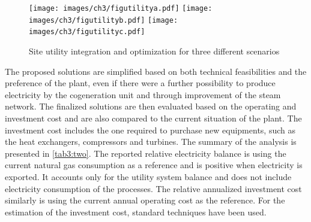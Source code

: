   \vspace{5mm}
 \begin{figure}[!ht]
 \begin{center}
 \texttt{[image: images/ch3/figutilitya.pdf]}
 \texttt{[image: images/ch3/figutilityb.pdf]}
 \texttt{[image: images/ch3/figutilityc.pdf]}
 \caption{Site utility integration and optimization for three different scenarios}
 \label{fig3:VIIII}
 \end{center}
  \vspace{-5mm}
 \end{figure}
 
 The proposed solutions are simplified based on both technical feasibilities and the preference of the plant, even if there were a further possibility to produce electricity by the cogeneration unit and through improvement of the steam network. The finalized solutions are then evaluated based on the operating and investment cost and are also compared to the current situation of the plant. The investment cost includes the one required to purchase new equipments, such as the heat exchangers, compressors and turbines. The summary of the analysis is presented in \cref{tab3:two}. The reported relative electricity balance is using the current natural gas consumption as a reference and is positive when electricity is exported. It accounts only for the utility system balance and does not include electricity consumption of the processes. The relative annualized investment cost similarly is using the current annual operating cost as the reference. For the estimation of the investment cost, standard techniques have been used. 
 
 \label{tab3:two}
 
 
 
 
